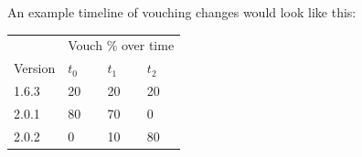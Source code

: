 \documentclass[]{article}
\makeatletter
\DeclareRobustCommand{\_}{%
  \leavevmode\vbox{%
    \hrule\@width.5em
          \@height-.26ex
          \@depth\dimexpr.26ex+.28pt\relax}}
\makeatother
\begin{document}
  An example timeline of vouching changes would look like this:

\begin{longtable}[]{@{}llll@{}}
\toprule
  & \multicolumn{3}{c}{Vouch \% over time} \tabularnewline\cmidrule{2-4}
\begin{minipage}[t]{0.1\columnwidth}\centering\strut
{Version}\strut
\end{minipage} & \begin{minipage}[t]{0.1\columnwidth}\centering\strut
{$t_0$}\strut
\end{minipage} & \begin{minipage}[t]{0.1\columnwidth}\centering\strut
{$t_1$}\strut
\end{minipage} & \begin{minipage}[t]{0.1\columnwidth}\centering\strut
{$t_2$}\strut
\end{minipage}\tabularnewline \midrule
\begin{minipage}[t]{0.1\columnwidth}\centering\strut
{1.6.3}\strut
\end{minipage} & \begin{minipage}[t]{0.1\columnwidth}\centering\strut
{20}\strut
\end{minipage} & \begin{minipage}[t]{0.1\columnwidth}\centering\strut
{20}\strut
\end{minipage} & \begin{minipage}[t]{0.1\columnwidth}\centering\strut
{20}\strut
\end{minipage}\tabularnewline
\begin{minipage}[t]{0.1\columnwidth}\centering\strut
{2.0.1}\strut
\end{minipage} & \begin{minipage}[t]{0.1\columnwidth}\centering\strut
{80}\strut
\end{minipage} & \begin{minipage}[t]{0.1\columnwidth}\centering\strut
{70}\strut
\end{minipage} & \begin{minipage}[t]{0.1\columnwidth}\centering\strut
{0}\strut
\end{minipage}\tabularnewline
\begin{minipage}[t]{0.1\columnwidth}\centering\strut
{2.0.2}\strut
\end{minipage} & \begin{minipage}[t]{0.1\columnwidth}\centering\strut
{0}\strut
\end{minipage} & \begin{minipage}[t]{0.1\columnwidth}\centering\strut
{10}\strut
\end{minipage} & \begin{minipage}[t]{0.1\columnwidth}\centering\strut
{80}\strut
\end{minipage}\tabularnewline
\bottomrule
\end{longtable}
\end{document}
